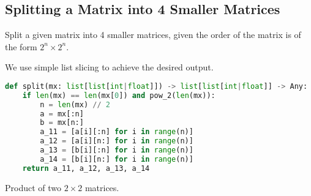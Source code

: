 \subsection{Splitting a Matrix into 4 Smaller Matrices}
\begin{eg}
	Split a given matrix into 4 smaller matrices, given the order of the matrix is of the form $2^n\times 2^n$.
\end{eg}
\begin{explanation}
	We use simple list slicing to achieve the desired output.
	\begin{lstlisting}[language=Python, numbers=none]
def split(mx: list[list[int|float]]) -> list[list[int|float]] -> Any:
	if len(mx) == len(mx[0]) and pow_2(len(mx)):
		n = len(mx) // 2
		a = mx[:n]
		b = mx[n:]
		a_11 = [a[i][:n] for i in range(n)]
		a_12 = [a[i][n:] for i in range(n)]
		a_13 = [b[i][:n] for i in range(n)]
		a_14 = [b[i][n:] for i in range(n)]
	return a_11, a_12, a_13, a_14 \end{lstlisting}
\end{explanation}
\begin{theorem}
	Product of two $2\times 2$ matrices.
\end{theorem}
